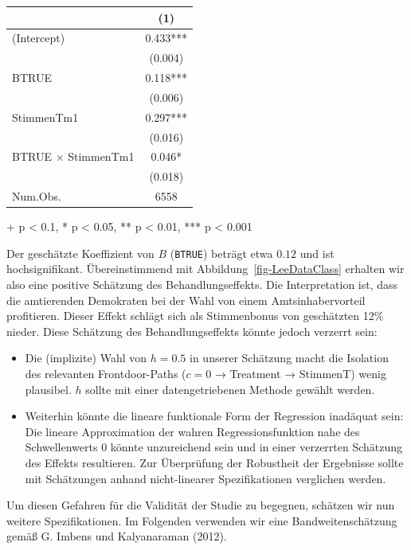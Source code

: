 \documentclass[
  a4paper,
  DIV=11,
  oneside]{scrreprt}
\begin{document}
\setlength{\LTpost}{0mm}
\begin{longtable*}{lc}
\toprule
  & (1) \\ 
\midrule\addlinespace[2.5pt]
(Intercept) & 0.433*** \\ 
 & (0.004) \\ 
BTRUE & 0.118*** \\ 
 & (0.006) \\ 
StimmenTm1 & 0.297*** \\ 
 & (0.016) \\ 
BTRUE × StimmenTm1 & 0.046* \\ 
 & (0.018) \\ 
Num.Obs. & 6558 \\ 
\bottomrule
\end{longtable*}
\begin{minipage}{\linewidth}
+ p < 0.1, * p < 0.05, ** p < 0.01, *** p < 0.001\\
\end{minipage}

Der geschätzte Koeffizient von \(B\) (\texttt{BTRUE}) beträgt etwa
\(0.12\) und ist hochsignifikant. Übereinstimmend mit
Abbildung~\ref{fig-LeeDataClass} erhalten wir also eine positive
Schätzung des Behandlungseffekts. Die Interpretation ist, dass die
amtierenden Demokraten bei der Wahl von einem Amtsinhabervorteil
profitieren. Dieser Effekt schlägt sich als Stimmenbonus von geschätzten
12\% nieder. Diese Schätzung des Behandlungseffekts könnte jedoch
verzerrt sein:

\begin{itemize}
\item
  Die (implizite) Wahl von \(h=0.5\) in unserer Schätzung macht die
  Isolation des relevanten Frontdoor-Paths (\(c=0\) → Treatment →
  StimmenT) wenig plausibel. \(h\) sollte mit einer datengetriebenen
  Methode gewählt werden.
\item
  Weiterhin könnte die lineare funktionale Form der Regression inadäquat
  sein: Die lineare Approximation der wahren Regressionsfunktion nahe
  des Schwellenwerts \(0\) könnte unzureichend sein und in einer
  verzerrten Schätzung des Effekts resultieren. Zur Überprüfung der
  Robustheit der Ergebnisse sollte mit Schätzungen anhand nicht-linearer
  Spezifikationen verglichen werden.
\end{itemize}

Um diesen Gefahren für die Validität der Studie zu begegnen, schätzen
wir nun weitere Spezifikationen. Im Folgenden verwenden wir eine
Bandweitenschätzung gemäß G. Imbens und Kalyanaraman (2012).
\end{document}
